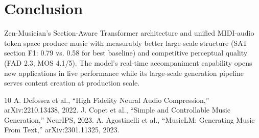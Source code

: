 \documentclass[11pt,a4paper]{article}
\begin{document}
\section{Conclusion}

Zen-Musician's Section-Aware Transformer architecture and unified MIDI-audio token space produce
music with measurably better large-scale structure (SAT section F1: 0.79 vs. 0.58 for best
baseline) and competitive perceptual quality (FAD 2.3, MOS 4.1/5). The model's real-time
accompaniment capability opens new applications in live performance while its large-scale
generation pipeline serves content creation at production scale.

\begin{thebibliography}{10}
 A. Defossez et al., ``High Fidelity Neural Audio Compression,'' arXiv:2210.13438, 2022.
 J. Copet et al., ``Simple and Controllable Music Generation,'' NeurIPS, 2023.
 A. Agostinelli et al., ``MusicLM: Generating Music From Text,'' arXiv:2301.11325, 2023.
\end{thebibliography}
\end{document}
